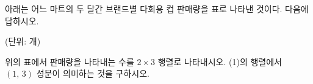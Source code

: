 아래는 어느 마트의 두 달간 브랜드별 다회용 컵 판매량을 표로 나타낸 것이다. 다음에 답하시오.\par\smallskip\noindent\hfill{\small (단위: 개)}\par\nobreak{}\par\smallskip\noindent
{} 위의 표에서 판매량을 나타내는 수를 $2\times 3$ 행렬로 나타내시오.
 (1)의 행렬에서 $(1,\,3)$ 성분이 의미하는 것을 구하시오.
